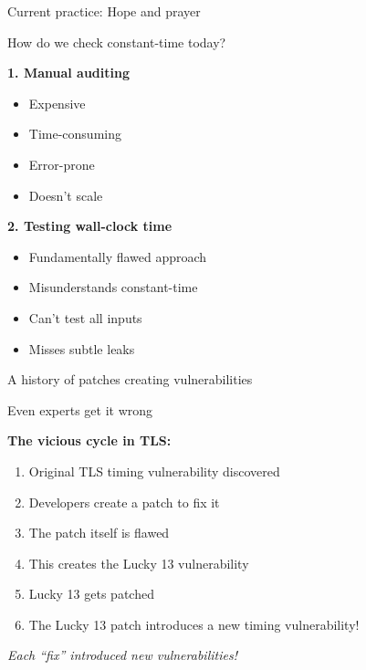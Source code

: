 \documentclass[aspectratio=169, lualatex, handout]{beamer}
\begin{document}
\begin{frame}{Current practice: Hope and prayer}
	\begin{center}
		\Large
		How do we check constant-time today?
	\end{center}
	\vspace{1em}
	\textbf{1. Manual auditing}
	\begin{itemize}
		\item Expensive
		\item Time-consuming
		\item Error-prone
		\item Doesn't scale
	\end{itemize}
	\vspace{0.5em}
	\textbf{2. Testing wall-clock time}
	\begin{itemize}
		\item Fundamentally flawed approach
		\item Misunderstands constant-time
		\item Can't test all inputs
		\item Misses subtle leaks
	\end{itemize}
\end{frame}

\begin{frame}{A history of patches creating vulnerabilities}
	\begin{center}
		\Large
		Even experts get it wrong
	\end{center}
	\vspace{1em}
	\textbf{The vicious cycle in TLS:}
	\begin{enumerate}
		\item Original TLS timing vulnerability discovered
		\item Developers create a patch to fix it
		\item The patch itself is flawed
		\item This creates the Lucky 13 vulnerability
		\item Lucky 13 gets patched
		\item The Lucky 13 patch introduces a new timing vulnerability!
	\end{enumerate}
	\vspace{1em}
	\begin{center}
		\textit{Each ``fix'' introduced new vulnerabilities!}
	\end{center}
\end{frame}
\end{document}
